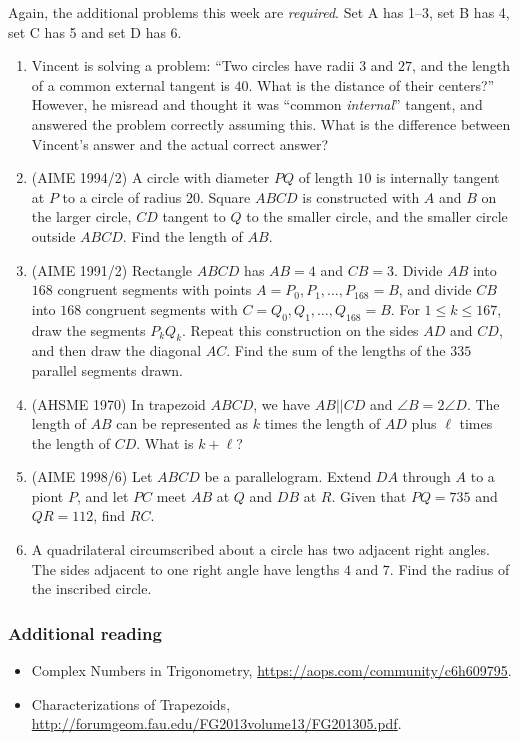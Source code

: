 \documentclass[10pt,paper=letter]{scrartcl}
\begin{document}
Again, the additional problems this week are \emph{required}. Set A has 1--3, set B has 4, set C has 5 and set D has 6.

\begin{enumerate}

  \item Vincent is solving a problem: ``Two circles have radii $3$ and $27$, and the length of a common external tangent is $40$. What is the distance of their centers?'' However, he misread and thought it was ``common \emph{internal}'' tangent, and answered the problem correctly assuming this. What is the difference between Vincent's answer and the actual correct answer?

  \item (AIME 1994/2) A circle with diameter $PQ$ of length $10$ is internally tangent at $P$ to a circle of radius $20$. Square $ABCD$ is constructed with $A$ and $B$ on the larger circle, $CD$ tangent to $Q$ to the smaller circle, and the smaller circle outside $ABCD$. Find the length of $AB$.

  \item (AIME 1991/2) Rectangle $ABCD$ has $AB = 4$ and $CB = 3$. Divide $AB$ into $168$ congruent segments with points $A = P_0, P_1, \ldots, P_{168} = B$, and divide $CB$ into $168$ congruent segments with $C = Q_0, Q_1, \ldots, Q_{168} = B$. For $1 \leq k \leq 167$, draw the segments $P_kQ_k$. Repeat this construction on the sides $AD$ and $CD$, and then draw the diagonal $AC$. Find the sum of the lengths of the $335$ parallel segments drawn.

  \item (AHSME 1970) In trapezoid $ABCD$, we have $AB||CD$ and $\angle B = 2\angle D$. The length of $AB$ can be represented as $k$ times the length of $AD$ plus $\ell$ times the length of $CD$. What is $k + \ell$?

  \item (AIME 1998/6) Let $ABCD$ be a parallelogram. Extend $DA$ through $A$ to a piont $P$, and let $PC$ meet $AB$ at $Q$ and $DB$ at $R$. Given that $PQ = 735$ and $QR = 112$, find $RC$.

  \item A quadrilateral circumscribed about a circle has two adjacent right angles. The sides adjacent to one right angle have lengths $4$ and $7$. Find the radius of the inscribed circle.
\end{enumerate}

\subsubsection*{Additional reading}

\begin{itemize}
  \item Complex Numbers in Trigonometry, \url{https://aops.com/community/c6h609795}.

  \item Characterizations of Trapezoids, \url{http://forumgeom.fau.edu/FG2013volume13/FG201305.pdf}.
\end{itemize}
\end{document}
